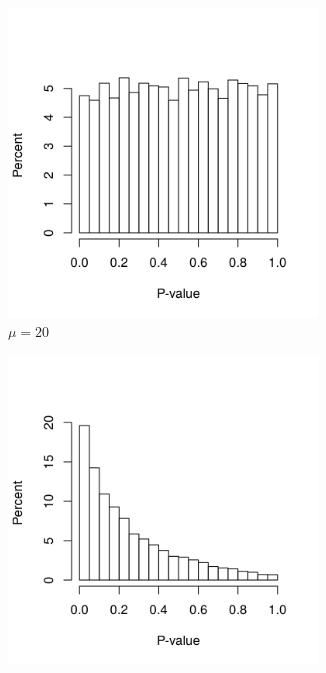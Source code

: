     \begin{figure}[ht]
        \centering

        \begin{subfigure}[b]{0.5\linewidth}
            \includegraphics[width=0.9\textwidth]{figures/part6a.png}
            \caption{$\mu=20$}
        \end{subfigure}
        \begin{subfigure}[b]{0.5\linewidth}
            \centering
            \includegraphics[width=0.9\textwidth]{figures/part6b.png} %

\end{subfigure}
\end{figure}
